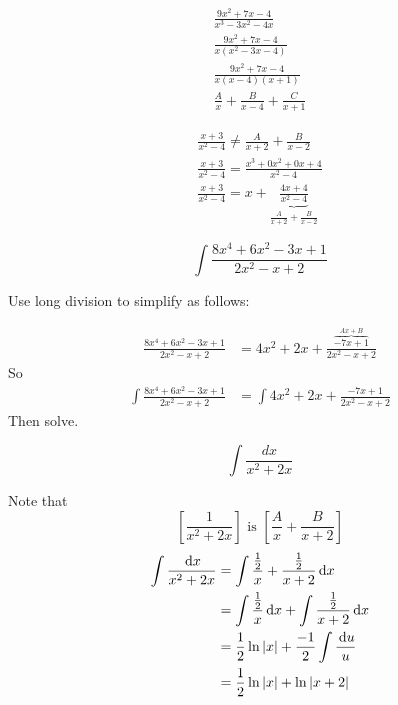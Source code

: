 \begin{ex}
  \begin{align*}
   \frac {9x^2+7x-4}{x^3-3x^2-4x} \\
   \frac {9x^2+7x-4}{x(x^2-3x-4)} \\
   \frac {9x^2+7x-4}{x(x-4)(x+1)} \\
   \frac{A}{x}+\frac{B}{x-4}+\frac{C}{x+1}
  \end{align*}
\end{ex}
\begin{ex}
  \begin{align*}
   \frac {x+3}{x^2-4} \neq \frac {A}{x+2} + \frac {B}{x-2} \\
   \frac {x+3}{x^2-4} = \frac {x^3+0x^2+0x+4}{x^2-4} \\
   \frac {x+3}{x^2-4} = x + \underbrace{\frac {4x+4}{x^2-4}}_{\frac{A}{x+2}+\frac{B}{x-2}}
 \end{align*}
\end{ex}
\begin{ex}
  \[ \int \frac{8x^4+6x^2-3x+1}{2x^2-x+2} \]
  \begin{sol}
  Use long division to simplify as follows:
    \begin{center}
    \end{center}
    \begin{align*}
      \frac{8x^4+6x^2-3x+1}{2x^2-x+2} &=
      4x^2+2x+\frac{\overbrace{-7x+1}^{Ax+B}}{2x^2-x+2}
    \end{align*}
    So
    \begin{align*}
      \int \frac{8x^4+6x^2-3x+1}{2x^2-x+2}
      &= \int 4x^2+2x+\frac{-7x+1}{2x^2-x+2}
    \end{align*}
    Then solve.
  \end{sol}
\end{ex}
\begin{ex}
  \[ \int \frac{dx}{x^2+2x} \]
  \begin{sol}
    Note that
    \[ \left[ \frac{1}{x^2+2x}\right] \text{ is }
    \left[\frac{A}{x}+\frac{B}{x+2}\right] \]
    \begin{align*}
      \int \frac{\,\mathrm{d} x}{x^2+2x} &=
      \int \frac{\frac{1}{2}}{x}+\frac{\frac{1}{2}}{x+2} \,\mathrm{d} x \\
      &= \int \frac{\frac{1}{2}}{x} \,\mathrm{d} x+\int\frac{\frac{1}{2}}{x+2} \,\mathrm{d} x \\
      &= \frac{1}{2}\ln{|x|}+\frac{-1}{2}\int\frac{\,\mathrm{d} u}{u} \\
      &= \frac{1}{2}\ln{|x|}+\ln{|x+2|}
    \end{align*}
  \end{sol}
\end{ex}

